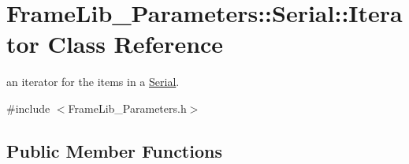 \hypertarget{class_frame_lib___parameters_1_1_serial_1_1_iterator}{}\section{Frame\+Lib\+\_\+\+Parameters\+:\+:Serial\+:\+:Iterator Class Reference}
\label{class_frame_lib___parameters_1_1_serial_1_1_iterator}


an iterator for the items in a \hyperlink{class_frame_lib___parameters_1_1_serial}{Serial}.  




{\ttfamily \#include $<$Frame\+Lib\+\_\+\+Parameters.\+h$>$}

\subsection*{Public Member Functions}

